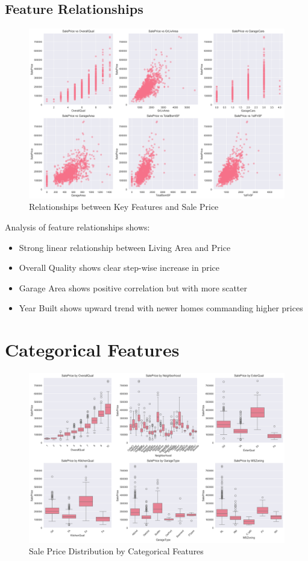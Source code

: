 \documentclass[12pt]{report}
\begin{document}
\subsection{Feature Relationships}
\begin{figure}[H]
    \centering
    \includegraphics[width=1.0\textwidth]{figures/feature_vs_price.png}
    \caption{Relationships between Key Features and Sale Price}
    \label{fig:feature_price_relation}
\end{figure}

Analysis of feature relationships shows:
\begin{itemize}
    \item Strong linear relationship between Living Area and Price
    \item Overall Quality shows clear step-wise increase in price
    \item Garage Area shows positive correlation but with more scatter
    \item Year Built shows upward trend with newer homes commanding higher prices
\end{itemize}

\section{Categorical Features}
\begin{figure}[H]
    \centering
    \includegraphics[width=1.0\textwidth]{figures/categorical_features_dist.png}
    \caption{Sale Price Distribution by Categorical Features}
    \label{fig:cat_features_dist}
\end{figure}
\end{document}
